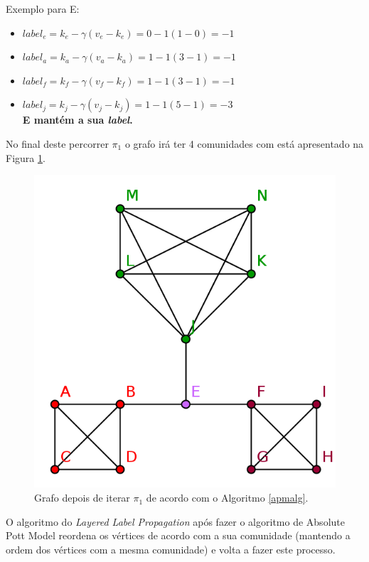   Exemplo para E:\\
  \begin{itemize}
   \item $label_e = k_e - \gamma ( v_e - k_e ) = 0 - 1 ( 1 - 0) = -1$
   \item $label_a = k_a - \gamma ( v_a - k_a ) = 1 - 1 ( 3 - 1) = -1$
   \item $label_f = k_f - \gamma ( v_f - k_f ) = 1 - 1 ( 3 - 1) = -1$ 
   \item $label_j = k_j - \gamma ( v_j - k_j ) = 1 - 1 ( 5 - 1) = -3$\\
   {\bf E mantém a sua \textit{label}.}
  \end{itemize}
  
  No final deste percorrer $\pi_1$ o grafo irá ter 4 comunidades com está apresentado na Figura \ref{graphfinalllp}.
  
  \begin{figure}[H]
    \center
    \includegraphics{graph_stepFinal.png}
    \caption{Grafo depois de iterar $\pi_1$ de acordo com o Algoritmo \ref{apmalg}.}
    \label{graphfinalllp}
  \end{figure}
  
  O algoritmo do \textit{Layered Label Propagation} após fazer o algoritmo de Absolute Pott Model reordena os vértices de acordo com a sua comunidade (mantendo a ordem dos vértices com a mesma comunidade) e volta a fazer este processo.

